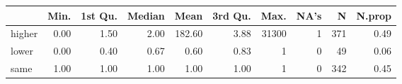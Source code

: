 \begin{table}[ht]
\centering
\begin{tabular}{lrrrrrrrrr}
  \hline
 & Min. & 1st Qu. & Median & Mean & 3rd Qu. & Max. & NA's & N & N.prop \\ 
  \hline
higher & 0.00 & 1.50 & 2.00 & 182.60 & 3.88 & 31300 &   1 & 371 & 0.49 \\ 
  lower & 0.00 & 0.40 & 0.67 & 0.60 & 0.83 &   1 &   0 &  49 & 0.06 \\ 
  same & 1.00 & 1.00 & 1.00 & 1.00 & 1.00 &   1 &   0 & 342 & 0.45 \\ 
   \hline
\end{tabular}
\end{table}
